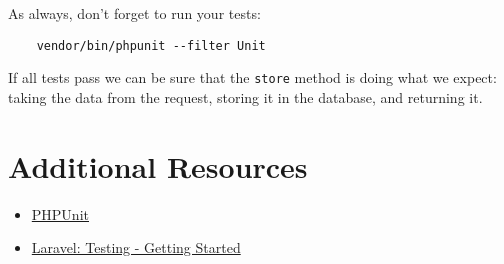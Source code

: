 As always, don't forget to run your tests:

\begin{verbatim}
    vendor/bin/phpunit --filter Unit
\end{verbatim}

If all tests pass we can be sure that the \texttt{store} method is doing what we expect: taking the data from the request, storing it in the database, and returning it.



\section{Additional Resources}

\begin{itemize}[leftmargin=*]
    \item \href{https://github.com/sebastianbergmann/phpunit}{PHPUnit}
    \item \href{http://laravel.com/docs/6.x/testing}{Laravel: Testing - Getting Started}
\end{itemize}
